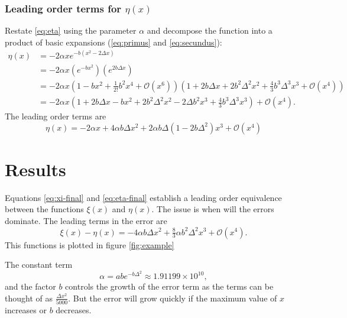 \documentclass[10pt, oneside]{article}
\newcommand{\paren}[1]			{ \left(  #1 \right) }
\begin{document}
\subsubsection{Leading order terms for $\eta(x)$}
Restate \eqref{eq:eta} using the parameter $\alpha$ and decompose the function into a product of basic expansions (\eqref{eq:primus} and \eqref{eq:secundus}):
\begin{equation}
	\begin{split}
		\eta (x) &= -2\alpha x e^{-b\paren{x^{2}-2\Delta x}} \\
				&= -2\alpha x \paren{e^{-bx^{2}}} \paren{e^{2b\Delta x}} \\
				&= -2\alpha x
					\paren{1 - bx^{2} + \frac{1}{2!}b^{2}x^{4} + \mathcal{O}\paren{x^{6}}}
					\paren{1 + 2b\Delta x + 2b^{2}\Delta^{2} x^{2} + \frac{4}{3}b^{3}\Delta^{3}x^{3} + \mathcal{O}\paren{x^{4}}} \\
				&= -2\alpha x \paren{1+2b\Delta x -bx^{2} + 2b^{2}\Delta^{2} x^{2} - 2\Delta b^{2}x^{3} + \frac{4}{3}b^{3}\Delta^{3}x^{3}} + \mathcal{O}\paren{x^{4}}.
	\end{split}
\end{equation}
The leading order terms are
\begin{equation}
	\boxed{
	\eta(x)  = -2 \alpha x + 4\alpha b \Delta x^{2}  + 2\alpha b \Delta \paren{1 - 2b\Delta^{2}} x^{3} + \mathcal{O}\paren{x^{4}}
	}
\label{eq:eta-final}
\end{equation}

\section{Results} %
Equations \eqref{eq:xi-final} and \eqref{eq:eta-final} establish a leading order equivalence between the functions $\xi(x)$ and $\eta(x)$. The issue is when will the errors dominate. The leading terms in the error are
\begin{equation}
	\xi(x) - \eta(x) = -4 \alpha b \Delta x^{2} + \tfrac{8}{3} \alpha b^{2} \Delta^{2} x^{3} + \mathcal{O}(x^{4}).
\label{eq:error}
\end{equation}
This functions is plotted in figure \ref{fig:example}

The constant term
\begin{equation}
	\alpha = ab e^{-b\Delta^{2}} \approx 1.91199 \times 10^{10},
\end{equation}
and the factor $b$ controls the growth of the error term as the terms can be thought of as $\frac{ \Delta x^{2} } { 5000 }$. But the error will grow quickly if the maximum value of $x$ increases or $b$ decreases.
\end{document}
